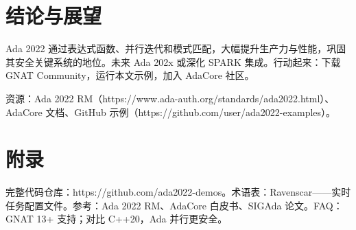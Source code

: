 \chapter{结论与展望}
Ada 2022 通过表达式函数、并行迭代和模式匹配，大幅提升生产力与性能，巩固其安全关键系统的地位。未来 Ada 202x 或深化 SPARK 集成。行动起来：下载 GNAT Community，运行本文示例，加入 AdaCore 社区。\par
资源：Ada 2022 RM（https://www.ada-auth.org/standards/ada2022.html）、AdaCore 文档、GitHub 示例（https://github.com/user/ada2022-examples）。\par
\chapter{附录}
完整代码仓库：https://github.com/ada2022-demos。术语表：Ravenscar——实时任务配置文件。参考：Ada 2022 RM、AdaCore 白皮书、SIGAda 论文。FAQ：GNAT 13+ 支持；对比 C++20，Ada 并行更安全。\par
